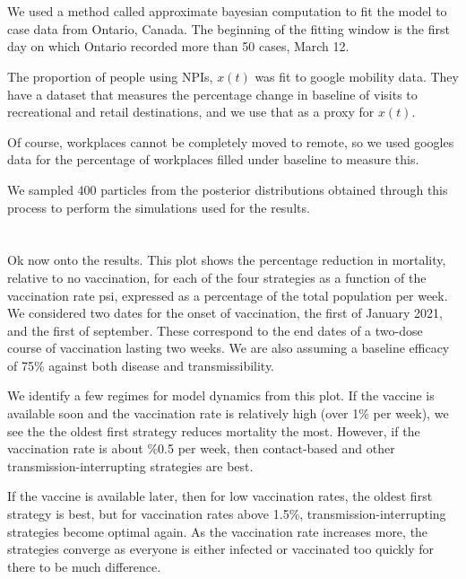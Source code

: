 \documentclass{article}
\begin{document}
\section{}
We used a method called approximate bayesian computation to fit the model to case data from Ontario, Canada. The beginning of the fitting window is the first day on which Ontario recorded more than 50 cases, March 12.

The proportion of people using NPIs, $x(t)$ was fit to google mobility data. They have a dataset that measures the percentage change in baseline of visits to recreational and retail destinations, and we use that as a proxy for $x(t)$.

Of course, workplaces cannot be completely moved to remote, so we used googles data for the percentage of workplaces filled under baseline to measure this.

We sampled 400 particles from the posterior distributions obtained through this process to perform the simulations used for the results.  

\section{}


Ok now onto the results. This plot shows the percentage reduction in mortality, relative to no vaccination, for each of the four strategies as a function of the vaccination rate psi, expressed as a percentage of the total population per week. We considered two dates for the onset of vaccination, the first of January 2021, and the first of september. These correspond to the end dates of a two-dose course of vaccination lasting two weeks. We are also assuming a baseline efficacy of 75\% against both disease and transmissibility.

We identify a few regimes for model dynamics from this plot. If the vaccine is available soon and the vaccination rate is relatively high (over 1\% per week), we see the the oldest first strategy reduces mortality the most. However, if the vaccination rate is about \%0.5 per week, then contact-based and other transmission-interrupting strategies are best.

If the vaccine is available later, then for low vaccination rates, the oldest first strategy is best, but for vaccination rates above 1.5\%, transmission-interrupting strategies become optimal again. As the vaccination rate increases more, the strategies converge as everyone is either infected or vaccinated too quickly for there to be much difference.
\end{document}
